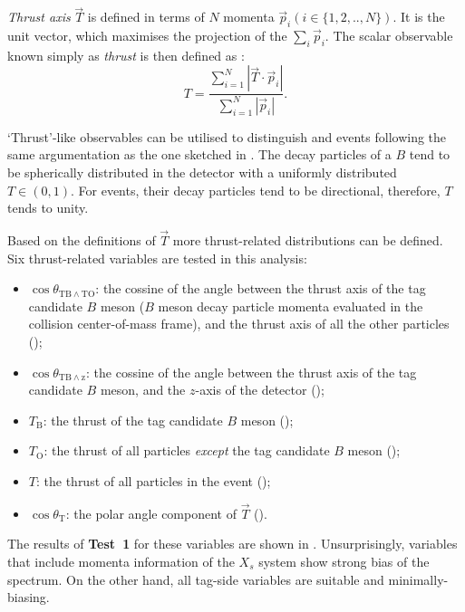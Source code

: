 \textit{Thrust axis} $\vec{T}$ is defined in terms of $N$ momenta $\vec{p}_i (i\in\{1,2,..,N\})$.
It is the unit vector, which maximises the projection of the $\sum_i\vec{p}_i$.
The scalar observable known simply as \textit{thrust} is then defined as \cite{BaBar:2014omp}:
\begin{equation}\label{eq:thrust}
    T = \frac{\sum^N_{i=1}|\vec{T}\cdot\vec{p}_i|}{\sum^N_{i=1}|\vec{p}_i|}.
\end{equation}

`Thrust'-like observables can be utilised to distinguish \epem\ra\qqbar and \BtoXsgamma events following the same argumentation as the one sketched in .
The decay particles of a $B$ tend to be spherically distributed in the detector with a uniformly distributed $T\in(0,1)$.
For \qqbar events, their decay particles tend to be directional, therefore, $T$ tends to unity.

Based on the definitions of $\vec{T}$ more thrust-related distributions can be defined.
Six thrust-related variables are tested in this analysis:
\begin{itemize}
    \item $\cos\theta_{\mathrm{TB}\wedge\mathrm{TO}}$: the cossine of the angle between the thrust axis of the tag candidate $B$ meson ($B$ meson decay particle momenta evaluated in the collision center-of-mass frame),
    and the thrust axis of all the other particles ();
    \item $\cos\theta_{\mathrm{TB}\wedge\mathrm{z}}$: the cossine of the angle between the thrust axis of the tag candidate $B$ meson,
    and the $z$-axis of the detector ();
    \item $T_{\mathrm{B}}$: the thrust of the tag candidate $B$ meson ();
    \item $T_{\mathrm{O}}$: the thrust of all particles \textit{except} the tag candidate $B$ meson ();
    \item $T$: the thrust of all particles in the event ();
    \item $\cos\theta_{\mathrm{T}}$: the polar angle component of $\vec{T}$ ().
\end{itemize}

The results of \textbf{Test~1} for these variables are shown in .
Unsurprisingly, variables that include momenta information of the $X_s$ system show strong bias of the \EB spectrum.
On the other hand, all tag-side variables are suitable and minimally-biasing.

